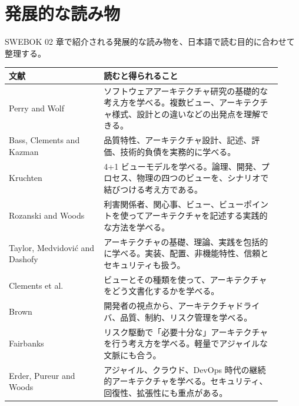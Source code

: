 \documentclass[a4paper,11pt]{ltjsarticle}
\begin{document}
\section{発展的な読み物}
SWEBOK 02 章で紹介される発展的な読み物を、日本語で読む目的に合わせて整理する。

\begin{longtable}{P{0.32\linewidth}P{0.60\linewidth}}
\toprule
文献 & 読むと得られること \\
\midrule
Perry and Wolf & ソフトウェアアーキテクチャ研究の基礎的な考え方を学べる。複数ビュー、アーキテクチャ様式、設計との違いなどの出発点を理解できる。 \\
Bass, Clements and Kazman & 品質特性、アーキテクチャ設計、記述、評価、技術的負債を実務的に学べる。 \\
Kruchten & 4+1 ビューモデルを学べる。論理、開発、プロセス、物理の四つのビューを、シナリオで結びつける考え方である。 \\
Rozanski and Woods & 利害関係者、関心事、ビュー、ビューポイントを使ってアーキテクチャを記述する実践的な方法を学べる。 \\
Taylor, Medvidović and Dashofy & アーキテクチャの基礎、理論、実践を包括的に学べる。実装、配置、非機能特性、信頼とセキュリティも扱う。 \\
Clements et al. & ビューとその種類を使って、アーキテクチャをどう文書化するかを学べる。 \\
Brown & 開発者の視点から、アーキテクチャドライバ、品質、制約、リスク管理を学べる。 \\
Fairbanks & リスク駆動で「必要十分な」アーキテクチャを行う考え方を学べる。軽量でアジャイルな文脈にも合う。 \\
Erder, Pureur and Woods & アジャイル、クラウド、DevOps 時代の継続的アーキテクチャを学べる。セキュリティ、回復性、拡張性にも重点がある。 \\
\bottomrule
\end{longtable}
\end{document}
